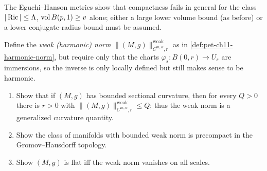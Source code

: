 \begin{remark}
  \label{rem:pet-ch11-exercise-11-6-14}
  The Eguchi--Hanson metrics show that compactness fails in general for the
  class $|\operatorname{Ric}|\le\Lambda$, $\operatorname{vol} B(p,1)\ge v$ alone; either a
  large lower volume bound (as before) or a lower conjugate-radius bound must
  be assumed.
\end{remark}

\begin{remark}
  \label{rem:pet-ch11-exercise-11-6-15}
  Define the \emph{weak (harmonic) norm} $\|(M,g)\|^{\mathrm{weak}}_{C^{m,\alpha},r}$
  as in \cref{def:pet-ch11-harmonic-norm}, but require only that the charts
  $\varphi_s:B(0,r)\to U_s$ are immersions, so the
  inverse is only locally defined but still makes sense to be harmonic.
  \begin{enumerate}
  \item Show that if $(M,g)$ has bounded sectional curvature, then for every
    $Q>0$ there is $r>0$ with $\|(M,g)\|^{\mathrm{weak}}_{C^{m,\alpha},r}\le Q$;
    thus the weak norm is a generalized curvature quantity.
  \item Show the class of manifolds with bounded weak norm is precompact in
    the Gromov--Hausdorff topology.
  \item Show $(M,g)$ is flat iff the weak norm vanishes on all scales.
  \end{enumerate}
\end{remark}
